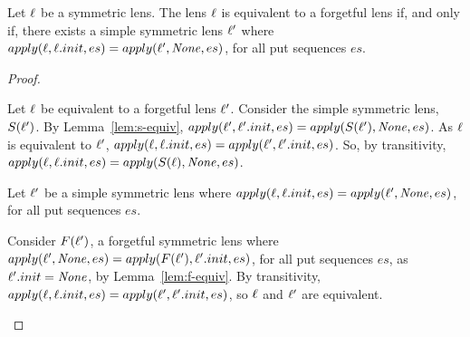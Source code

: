 \documentclass[acmsmall,screen,anonymous]{acmart}
\begin{document}
\begin{theorem}
  Let $\mathit{\ell}$ be a symmetric lens. The lens $\mathit{\ell}$ is equivalent to a forgetful
  lens if, and only if, there exists a simple symmetric lens $\mathit{\ell}'$ where
  $apply(\mathit{\ell},\mathit{\ell}.init,es) = apply(\mathit{\ell}',\mathit{None},es)$, for all put sequences
  $es$.
\end{theorem}

\begin{proof}
  \begin{case}[$\Rightarrow$]
    Let $\mathit{\ell}$ be equivalent to a forgetful lens $\mathit{\ell}'$.  Consider the
    simple symmetric lens, $S(\mathit{\ell}')$.  By Lemma~\ref{lem:s-equiv},
    $apply(\mathit{\ell}',\mathit{\ell}'.init,es) = apply(S(\mathit{\ell}'),\mathit{None},es)$.  As $\mathit{\ell}$ is
    equivalent to $\mathit{\ell}'$, $apply(\mathit{\ell},\mathit{\ell}.init,es) =
    apply(\mathit{\ell}',\mathit{\ell}'.init,es)$.  So, by transitivity,
    $apply(\mathit{\ell},\mathit{\ell}.init,es) = apply(S(\mathit{\ell}),\mathit{None},es)$.
  \end{case}

  \begin{case}[$\Leftarrow$]
    Let $\mathit{\ell}'$ be a simple symmetric lens where $apply(\mathit{\ell},\mathit{\ell}.init,es) =
    apply(\mathit{\ell}',\mathit{None},es)$, for all put sequences $es$.

    Consider $F(\mathit{\ell}')$, a forgetful symmetric lens where $apply(\mathit{\ell}',\mathit{None},es) =
    apply(F(\mathit{\ell}'),\mathit{\ell}'.init,es)$, for all put sequences $es$, as
    $\mathit{\ell}'.init = \mathit{None}$, by Lemma~\ref{lem:f-equiv}.  By transitivity, $apply(\mathit{\ell},\mathit{\ell}.init,es) =
    apply(\mathit{\ell}',\mathit{\ell}'.init,es)$, so $\mathit{\ell}$ and $\mathit{\ell}'$ are equivalent.
  \end{case}
    
\end{proof}

\fi
\end{document}
